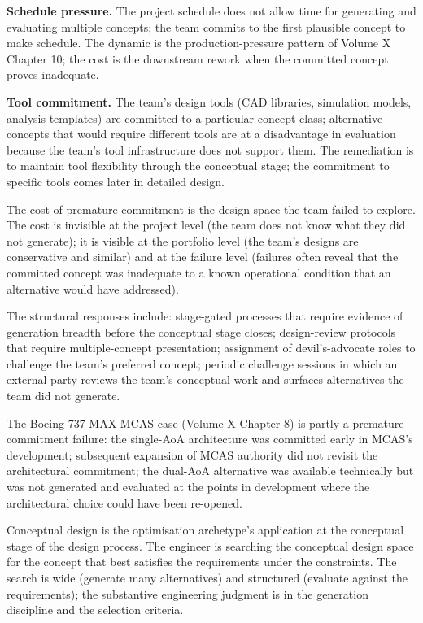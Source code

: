 \textbf{Schedule pressure.} The project schedule does not allow time for generating and evaluating multiple concepts; the team commits to the first plausible concept to make schedule. The dynamic is the production-pressure pattern of Volume X Chapter 10; the cost is the downstream rework when the committed concept proves inadequate.

\textbf{Tool commitment.} The team's design tools (CAD libraries, simulation models, analysis templates) are committed to a particular concept class; alternative concepts that would require different tools are at a disadvantage in evaluation because the team's tool infrastructure does not support them. The remediation is to maintain tool flexibility through the conceptual stage; the commitment to specific tools comes later in detailed design.

The cost of premature commitment is the design space the team failed to explore. The cost is invisible at the project level (the team does not know what they did not generate); it is visible at the portfolio level (the team's designs are conservative and similar) and at the failure level (failures often reveal that the committed concept was inadequate to a known operational condition that an alternative would have addressed).

The structural responses include: stage-gated processes that require evidence of generation breadth before the conceptual stage closes; design-review protocols that require multiple-concept presentation; assignment of devil's-advocate roles to challenge the team's preferred concept; periodic challenge sessions in which an external party reviews the team's conceptual work and surfaces alternatives the team did not generate.

The Boeing 737 MAX MCAS case (Volume X Chapter 8) is partly a premature-commitment failure: the single-AoA architecture was committed early in MCAS's development; subsequent expansion of MCAS authority did not revisit the architectural commitment; the dual-AoA alternative was available technically but was not generated and evaluated at the points in development where the architectural choice could have been re-opened.

\begin{archetype}[optimisation]
Conceptual design is the optimisation archetype's application at the conceptual stage of the design process. The engineer is searching the conceptual design space for the concept that best satisfies the requirements under the constraints. The search is wide (generate many alternatives) and structured (evaluate against the requirements); the substantive engineering judgment is in the generation discipline and the selection criteria.
\end{archetype}

